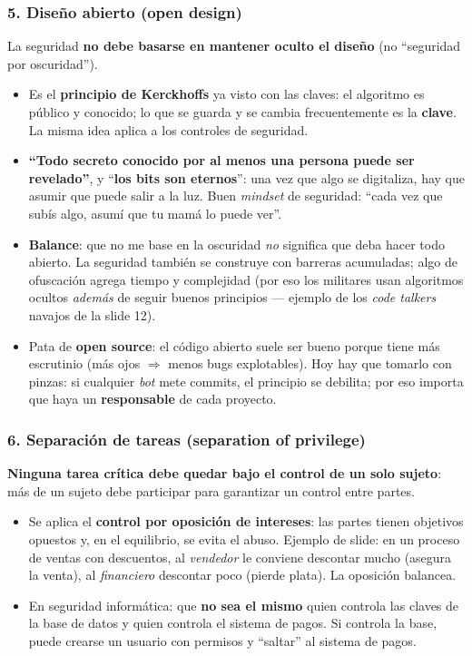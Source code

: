 \documentclass[11pt,a4paper]{article}
\begin{document}
\subsubsection{5. Diseño abierto (open design)}
La seguridad \textbf{no debe basarse en mantener oculto el diseño} (no ``seguridad por
oscuridad'').
\begin{itemize}[leftmargin=1.4em,itemsep=1pt]
  \item Es el \textbf{principio de Kerckhoffs} ya visto con las claves: el algoritmo es público
        y conocido; lo que se guarda y se cambia frecuentemente es la \textbf{clave}. La misma
        idea aplica a los controles de seguridad.
  \item \textbf{``Todo secreto conocido por al menos una persona puede ser revelado''}, y
        ``\textbf{los bits son eternos}'': una vez que algo se digitaliza, hay que asumir que
        puede salir a la luz. Buen \emph{mindset} de seguridad: ``cada vez que subís algo,
        asumí que tu mamá lo puede ver''.
  \item \textbf{Balance}: que no me base en la oscuridad \emph{no} significa que deba hacer
        todo abierto. La seguridad también se construye con barreras acumuladas; algo de
        ofuscación agrega tiempo y complejidad (por eso los militares usan algoritmos ocultos
        \emph{además} de seguir buenos principios — ejemplo de los \emph{code talkers} navajos
        de la slide 12).
  \item Pata de \textbf{open source}: el código abierto suele ser bueno porque tiene más
        escrutinio (más ojos $\Rightarrow$ menos bugs explotables). Hoy hay que tomarlo con
        pinzas: si cualquier \emph{bot} mete commits, el principio se debilita; por eso importa
        que haya un \textbf{responsable} de cada proyecto.
\end{itemize}

\subsubsection{6. Separación de tareas (separation of privilege)}
\textbf{Ninguna tarea crítica debe quedar bajo el control de un solo sujeto}: más de un sujeto
debe participar para garantizar un control entre partes.
\begin{itemize}[leftmargin=1.4em,itemsep=1pt]
  \item Se aplica el \textbf{control por oposición de intereses}: las partes tienen objetivos
        opuestos y, en el equilibrio, se evita el abuso. Ejemplo de slide: en un proceso de
        ventas con descuentos, al \emph{vendedor} le conviene descontar mucho (asegura la
        venta), al \emph{financiero} descontar poco (pierde plata). La oposición balancea.
  \item En seguridad informática: que \textbf{no sea el mismo} quien controla las claves de la
        base de datos y quien controla el sistema de pagos. Si controla la base, puede crearse
        un usuario con permisos y ``saltar'' al sistema de pagos.
\end{itemize}
\end{document}
